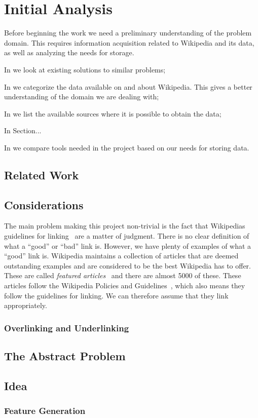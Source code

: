 \chapter{Initial Analysis}\label{chap:analysis}
Before beginning the work we need a preliminary understanding of the problem domain. This requires information acquisition related to Wikipedia and its data, as well as analyzing the needs for storage.

\begin{chapterorganization}
  \item In  we look at existing solutions to similar problems;
  \item In  we categorize the data available on and about Wikipedia. This gives a better understanding of the domain we are dealing with;
  \item In  we list the available sources where it is possible to obtain the data;
  \item In Section...
  \item In  we compare tools needed in the project based on our needs for storing data.
\end{chapterorganization}

\section{Related Work}\label{sec:related_work}
\dummy

\section{Considerations}
The main problem making this project non-trivial is the fact that Wikipedias guidelines for linking~\cite{wiki-manual-of-style-overlinking} are a matter of judgment. There is no clear definition of what a ``good'' or ``bad'' link is. However, we have plenty of examples of what a ``good'' link is.
Wikipedia maintains a collection of articles that are deemed outstanding examples and are considered to be the best Wikipedia has to offer. These are called \emph{featured articles}~\cite{wiki-featured-articles} and there are almost 5000 of these. These articles follow the Wikipedia Policies and Guidelines~\cite{wiki-editor-guidelines}, which also means they follow the guidelines for linking. We can therefore assume that they link appropriately.

\subsection{Overlinking and Underlinking}

\section{The Abstract Problem} 


\section{Idea} 

\subsection{Feature Generation}
\dummy

%
